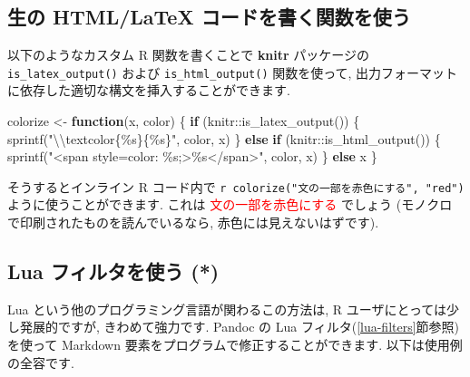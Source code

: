 \documentclass[
  11pt,
  lualatex,ja=standard,jafont=noto]{bxjsreport}
\newenvironment{Shaded}{\begin{snugshade}}{\end{snugshade}}
\newcommand{\ControlFlowTok}[1]{\textcolor[rgb]{0.13,0.29,0.53}{\textbf{#1}}}
\newcommand{\FunctionTok}[1]{\textcolor[rgb]{0.00,0.00,0.00}{#1}}
\newcommand{\NormalTok}[1]{#1}
\newcommand{\OtherTok}[1]{\textcolor[rgb]{0.56,0.35,0.01}{#1}}
\newcommand{\SpecialCharTok}[1]{\textcolor[rgb]{0.00,0.00,0.00}{#1}}
\newcommand{\StringTok}[1]{\textcolor[rgb]{0.31,0.60,0.02}{#1}}
\begin{document}
\hypertarget{using-an-r-function-to-write-raw-html-or-latex-code}{%
\subsection{生の HTML/LaTeX コードを書く関数を使う}\label{using-an-r-function-to-write-raw-html-or-latex-code}}

以下のようなカスタム R 関数を書くことで \textbf{knitr}  パッケージの \texttt{is\_latex\_output()} および \texttt{is\_html\_output()} 関数を使って, 出力フォーマットに依存した適切な構文を挿入することができます.

\begin{Shaded}
\begin{Highlighting}[numbers=left,,]
\NormalTok{colorize }\OtherTok{\textless{}{-}} \ControlFlowTok{function}\NormalTok{(x, color) \{}
  \ControlFlowTok{if}\NormalTok{ (knitr}\SpecialCharTok{::}\FunctionTok{is\_latex\_output}\NormalTok{()) \{}
    \FunctionTok{sprintf}\NormalTok{(}\StringTok{"}\SpecialCharTok{\textbackslash{}\textbackslash{}}\StringTok{textcolor\{\%s\}\{\%s\}"}\NormalTok{, color, x)}
\NormalTok{  \} }\ControlFlowTok{else} \ControlFlowTok{if}\NormalTok{ (knitr}\SpecialCharTok{::}\FunctionTok{is\_html\_output}\NormalTok{()) \{}
    \FunctionTok{sprintf}\NormalTok{(}\StringTok{"\textless{}span style=\textquotesingle{}color: \%s;\textquotesingle{}\textgreater{}\%s\textless{}/span\textgreater{}"}\NormalTok{, color, }
\NormalTok{      x)}
\NormalTok{  \} }\ControlFlowTok{else}\NormalTok{ x}
\NormalTok{\}}
\end{Highlighting}
\end{Shaded}

そうするとインライン R コード内で \texttt{\textasciigrave{}r\ colorize("文の一部を赤色にする",\ "red")\textasciigrave{}} ように使うことができます. これは \textcolor{red}{文の一部を赤色にする} でしょう (モノクロで印刷されたものを読んでいるなら, 赤色には見えないはずです).

\hypertarget{lua-color}{%
\subsection{Lua フィルタを使う (*)}\label{lua-color}}

Lua という他のプログラミング言語が関わるこの方法は, R ユーザにとっては少し発展的ですが, きわめて強力です. Pandoc の Lua フィルタ(\ref{lua-filters}節参照)を使って Markdown 要素をプログラムで修正することができます. 以下は使用例の全容です.
\end{document}
